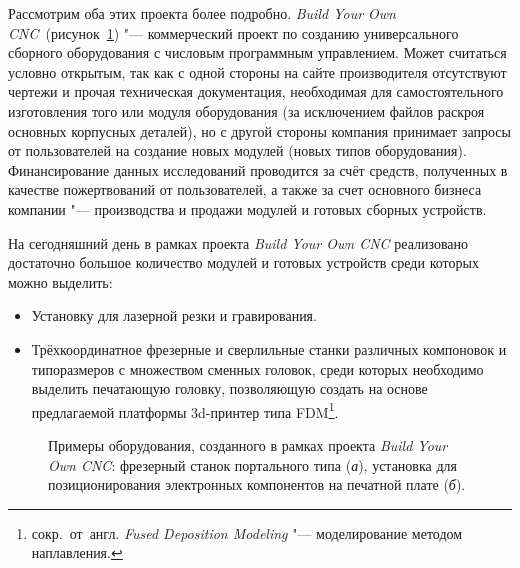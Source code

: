 Рассмотрим оба этих проекта более подробно. \textit{Build Your Own CNC}~(рисунок~\cref{fig:byocnc}) "--- коммерческий проект по созданию универсального сборного оборудования с числовым программным управлением. Может считаться условно открытым, так как с одной стороны на сайте производителя отсутствуют чертежи и прочая техническая документация, необходимая для самостоятельного изготовления того или модуля оборудования (за исключением файлов раскроя основных корпусных деталей), но с другой стороны компания принимает запросы от пользователей на создание новых модулей (новых типов оборудования). Финансирование данных исследований проводится за счёт средств, полученных в качестве пожертвований от пользователей, а также за счет основного бизнеса компании "--- производства и продажи модулей и готовых сборных устройств.

На сегодняшний день в рамках проекта \textit{Build Your Own CNC} реализовано достаточно большое количество модулей и готовых устройств среди которых можно выделить:

\begin{itemize}
	\item Установку для лазерной резки и гравирования.
	
	\item Трёхкоординатное фрезерные и сверлильные станки различных компоновок и типоразмеров с множеством сменных головок, среди которых необходимо выделить печатающую головку, позволяющую создать на основе предлагаемой платформы 3d-принтер типа FDM\footnote{сокр.~от~англ. \textit{Fused Deposition Modeling} "--- моделирование методом наплавления.}.
\end{itemize}

\begin{figure}[ht]
	\caption[Примеры оборудования, созданного в рамках проекта \textit{Build Your Own CNC}]%
	{Примеры оборудования, созданного в рамках проекта \textit{Build Your Own CNC}: фрезерный станок портального типа (\textit{а}), установка для позиционирования электронных компонентов на печатной плате (\textit{б}).}\label{fig:byocnc}
\end{figure}


